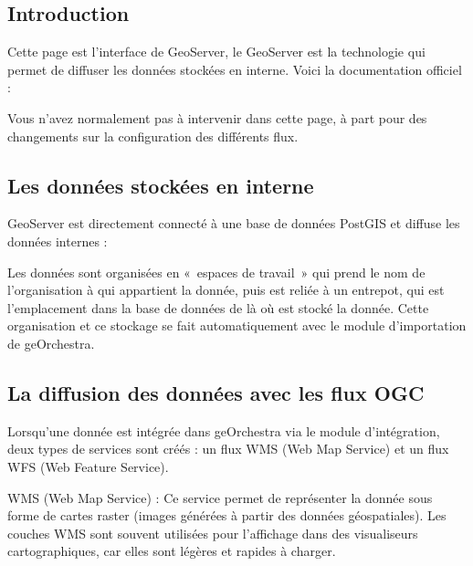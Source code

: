\documentclass[letterpaper,10pt,french]{sphinxmanual}
\let\sphinxpxdimen\pdfpxdimen\else\newdimen\sphinxpxdimen
\begin{document}
\subsection{Introduction}
\label{\detokenize{doc_admin/services:introduction}}
\sphinxAtStartPar
Cette page est l’interface de GeoServer, le GeoServer est la technologie qui permet de diffuser les données stockées en interne.
Voici la documentation officiel :

\sphinxAtStartPar
Vous n’avez normalement pas à intervenir dans cette page, à part pour des changements sur la configuration des différents flux.


\subsection{Les données stockées en interne}
\label{\detokenize{doc_admin/services:les-donnees-stockees-en-interne}}
\sphinxAtStartPar
GeoServer est directement connecté à une base de données PostGIS et diffuse les données internes :

\noindent{\hspace*{\fill}\sphinxincludegraphics[width=700\sphinxpxdimen]{{geos_interface}.png}\hspace*{\fill}}

\sphinxAtStartPar
Les données sont organisées en « espaces de travail » qui prend le nom de l’organisation à qui appartient la donnée, puis est reliée à un entrepot, qui est l’emplacement
dans la base de données de là où est stocké la donnée. Cette organisation et ce stockage se fait automatiquement avec le module d’importation de geOrchestra.


\subsection{La diffusion des données avec les flux OGC}
\label{\detokenize{doc_admin/services:la-diffusion-des-donnees-avec-les-flux-ogc}}
\sphinxAtStartPar
Lorsqu’une donnée est intégrée dans geOrchestra via le module d’intégration, deux types de services sont créés : un flux WMS (Web Map Service)
et un flux WFS (Web Feature Service).

\sphinxAtStartPar
WMS (Web Map Service) : Ce service permet de représenter la donnée sous forme de cartes raster (images générées à partir des données géospatiales).
Les couches WMS sont souvent utilisées pour l’affichage dans des visualiseurs cartographiques, car elles sont légères et rapides à charger.
\end{document}
